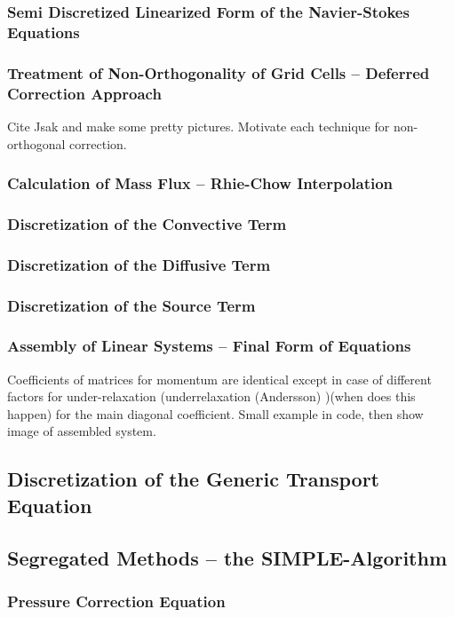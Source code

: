 \documentclass[article,type=msc,colorback,accentcolor=tud2a]{tudthesis}
\begin{document}
      \subsubsection{Semi Discretized Linearized Form of the Navier-Stokes Equations}
      \subsubsection{Treatment of Non-Orthogonality of Grid Cells -- Deferred Correction Approach}
        Cite Jsak and make some pretty pictures. Motivate each technique for non-orthogonal correction.
      \subsubsection{Calculation of Mass Flux -- Rhie-Chow Interpolation}
      \subsubsection{Discretization of the Convective Term}
      \subsubsection{Discretization of the Diffusive Term}
      \subsubsection{Discretization of the Source Term}
      \subsubsection{Assembly of Linear Systems -- Final Form of Equations}
        Coefficients of matrices for momentum are identical except in case of different factors for under-relaxation (underrelaxation (Andersson) )(when does this happen) for the main diagonal coefficient. Small example in code, then show image of assembled system.

    \subsection{Discretization of the Generic Transport Equation}

    \subsection{Segregated Methods -- the SIMPLE-Algorithm}
      
      \subsubsection{Pressure Correction Equation}
\end{document}
